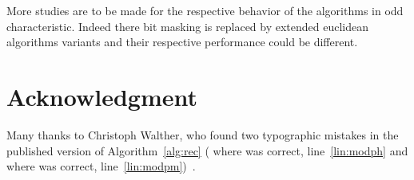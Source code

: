 More studies are to be made for the respective behavior of the algorithms in odd
characteristic. Indeed there bit masking is replaced by extended euclidean
algorithms variants and their respective performance could be different.

\section*{Acknowledgment} 
Many thanks to Christoph Walther, who found two typographic mistakes 
in the published version of Algorithm~\ref{alg:rec} ( where  was
correct, line~\ref{lin:modph} and  where  was correct,
line~\ref{lin:modpm})~\cite{Walther:2018:cav}.




